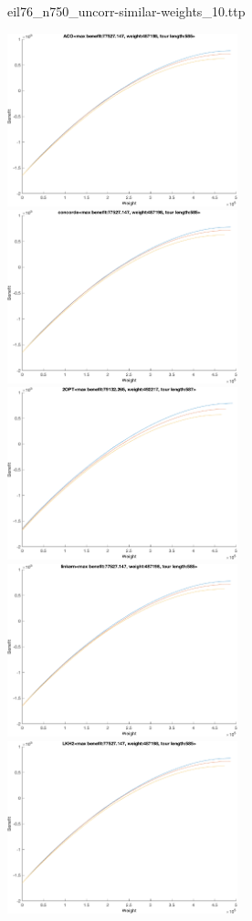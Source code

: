 \documentclass{article}
\begin{document}
\newpage
eil76\_n750\_uncorr-similar-weights\_10.ttp

\noindent
\includegraphics[width=0.5\textwidth]{eil76figs/eil76_n750_uncorr-similar-weights_10.ttp.aco.txt.atsf.eps}
\includegraphics[width=0.5\textwidth]{eil76figs/eil76_n750_uncorr-similar-weights_10.ttp.con.txt.atsf.eps}
\includegraphics[width=0.5\textwidth]{eil76figs/eil76_n750_uncorr-similar-weights_10.ttp.inv.txt.atsf.eps}
\includegraphics[width=0.5\textwidth]{eil76figs/eil76_n750_uncorr-similar-weights_10.ttp.lkh.txt.atsf.eps}
\includegraphics[width=0.5\textwidth]{eil76figs/eil76_n750_uncorr-similar-weights_10.ttp.lkh2.txt.atsf.eps}


% 
%  
\end{document}
